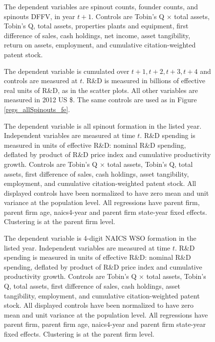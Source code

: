 \documentclass[12pt,english]{article}
\theoremstyle{remark}
\begin{document}
\begin{figure}[p]
	\centering
	
	\caption{The dependent variables are spinout counts, founder counts, and spinouts DFFV, in year $t+1$. Controls are Tobin's Q $\times$ total assets, Tobin's Q, total assets, properties plants and equipment, first difference of sales, cash holdings, net income, asset tangibility, return on assets, employment, and cumulative citation-weighted patent stock.}
	\label{regs_allspinouts_fe_accounting}
\end{figure}

\begin{figure}[p]
	\centering
	
	\caption{The dependent variable is cumulated over $t+1,t+2,t+3,t+4$ and controls are measured at $t$. R\&D is measured in billions of effective real units of R\&D, as in the scatter plots. All other variables are measured in 2012 US \$. The same controls are used as in Figure \ref{regs_allSpinouts_fe}.}
	\label{regs_spinouts_wso_fe_accounting}
\end{figure}

\begin{figure}[p]
	\centering
	\small
	
	\caption{\small The dependent variable is all spinout formation in the listed year. Independent variables are measured at time $t$. R\&D spending is measured in units of effective R\&D: nominal R\&D spending, deflated by product of R\&D price index and cumulative productivity growth. Controls are Tobin's Q $\times$ total assets, Tobin's Q, total assets, first difference of sales, cash holdings, asset tangibility, employment, and cumulative citation-weighted patent stock. All displayed controls have been normalized to have zero mean and unit variance at the population level. All regressions have parent firm, parent firm age, naics4-year and parent firm state-year fixed effects. Clustering is at the parent firm level.}
	\label{regs_spinouts_accounting}
\end{figure}

\begin{figure}[p]
	\centering
	\small
	
	\caption{\small The dependent variable is 4-digit NAICS WSO formation in the listed year. Independent variables are measured at time $t$. R\&D spending is measured in units of effective R\&D: nominal R\&D spending, deflated by product of R\&D price index and cumulative productivity growth. Controls are Tobin's Q $\times$ total assets, Tobin's Q, total assets, first difference of sales, cash holdings, asset tangibility, employment, and cumulative citation-weighted patent stock. All displayed controls have been normalized to have zero mean and unit variance at the population level. All regressions have parent firm, parent firm age, naics4-year and parent firm state-year fixed effects. Clustering is at the parent firm level.}
	\label{regs_spinouts_wso4_accounting}
\end{figure}
\end{document}
